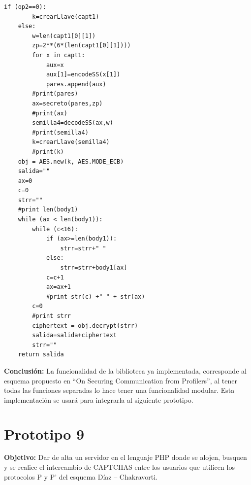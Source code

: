 \documentclass[12pt,oneside,onecolumn,openany]{report}
\begin{document}
\begin{itemize}
\begin{lstlisting}[frame=single]
	if (op2==0):
		k=crearLlave(capt1)
	else:
		w=len(capt1[0][1])
		zp=2**(6*(len(capt1[0][1])))
		for x in capt1:
			aux=x
			aux[1]=encodeSS(x[1])
			pares.append(aux)	
		#print(pares)
		ax=secreto(pares,zp)
		#print(ax)
		semilla4=decodeSS(ax,w)
		#print(semilla4)
		k=crearLlave(semilla4)
		#print(k)
	obj = AES.new(k, AES.MODE_ECB)
	salida=""
	ax=0
	c=0
	strr=""
	#print len(body1)
	while (ax < len(body1)):
		while (c<16):
			if (ax>=len(body1)):
				strr=strr+" "
			else:
				strr=strr+body1[ax]
			c=c+1
			ax=ax+1
			#print str(c) +" " + str(ax) 
		c=0
		#print strr
		ciphertext = obj.decrypt(strr)
		salida=salida+ciphertext
		strr=""
	return salida
 \end{lstlisting}

\end{itemize}
\textbf{Conclusión:} La funcionalidad de la biblioteca ya implementada, corresponde al esquema propuesto en “On Securing  Communication  from Profilers”, al tener todas las funciones separadas lo hace tener una funcionalidad modular. Esta implementación se usará para integrarla al siguiente prototipo.
\section{Prototipo 9}
\textbf{Objetivo:} Dar de alta un servidor en el lenguaje PHP donde se alojen, busquen y se realice el intercambio de CAPTCHAS entre los usuarios que utilicen los protocolos P y P’ del esquema Díaz – Chakravorti.
\end{document}
